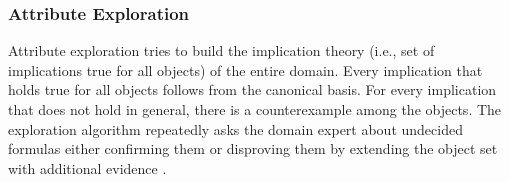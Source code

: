\subsubsection{Attribute Exploration}
\label{subsec:basic_ae}
Attribute exploration tries to build the implication theory (i.e., set of implications true for all objects) of the entire domain.
Every implication that holds true for all objects follows from the canonical basis.
For every implication that does not hold in general, there is a counterexample among the objects.
The exploration algorithm repeatedly asks the domain expert about undecided formulas either confirming them or disproving them by extending the object set with additional evidence \cite{ganter_conceptual_2016}.